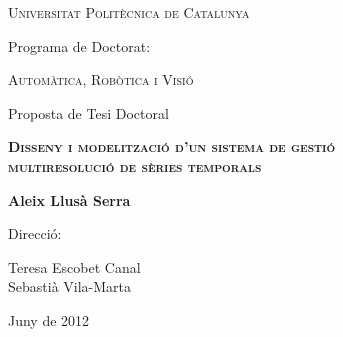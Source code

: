 \begin{titlepage}
  \begin{center} 

   

    {\Large \scshape Universitat Politècnica de Catalunya} \vskip 1cm 

    {Programa de Doctorat:} \vskip 0.5cm 
    
    {\scshape Automàtica, Robòtica i Visió} \vfill%

    {Proposta de Tesi Doctoral} \vskip 1cm 
    
    {\scshape \bfseries \Large Disseny i modelització d'un sistema de gestió\\
       multiresolució de sèries temporals} \vskip 2cm

    {\bfseries Aleix Llusà Serra} \vfill%

    {Direcció:}
       
    {Teresa Escobet Canal \\
    Sebastià Vila-Marta}  \vskip 1cm 


    {Juny de 2012}

\end{center}
\end{titlepage}


